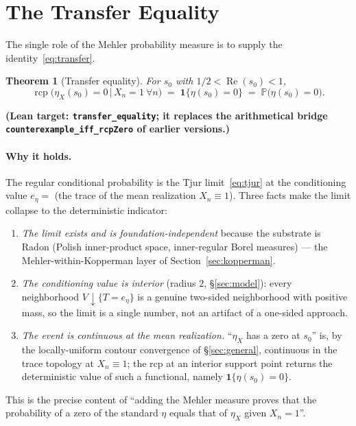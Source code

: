 \documentclass[11pt,a4paper]{article}
\newtheorem{theorem}{Theorem}[section]
\theoremstyle{definition}
\newcommand{\Rea}{\operatorname{Re}}
\newcommand{\etaX}{\eta_X}
\newcommand{\rcp}{\operatorname{rcp}}
\begin{document}
\section{The Transfer Equality}\label{sec:transfer}

The single role of the Mehler probability measure is to supply the identity~\eqref{eq:transfer}.

\begin{theorem}[Transfer equality]\label{thm:transfer}
For \(s_0\) with \(1/2<\Rea(s_0)<1\),
\[
  \rcp\bigl(\etaX(s_0)=0 \,\big|\, X_n=1\ \forall n\bigr)
  \;=\; \mathbf{1}\{\eta(s_0)=0\}
  \;=\; \mathbb{P}\bigl(\eta(s_0)=0\bigr).
\]
\end{theorem}
\textbf{(Lean target: \texttt{transfer\_equality}; it replaces the arithmetical bridge
\texttt{counterexample\_iff\_rcpZero} of earlier versions.)}

\paragraph{Why it holds.} The regular conditional probability is the Tjur
limit~\eqref{eq:tjur} at the conditioning value \(e_\eta=\) (the trace of the mean
realization \(X_n\equiv1\)). Three facts make the limit collapse to the deterministic
indicator:
\begin{enumerate}
  \item \emph{The limit exists and is foundation-independent} because the substrate is
        Radon (Polish inner-product space, inner-regular Borel measures) --- the
        Mehler-within-Kopperman layer of Section~\ref{sec:kopperman}.
  \item \emph{The conditioning value is interior} (radius \(2\), \S\ref{sec:model}): every
        neighborhood \(V\downarrow\{T=e_\eta\}\) is a genuine two-sided neighborhood with
        positive mass, so the limit is a single number, not an artifact of a one-sided
        approach.
  \item \emph{The event is continuous at the mean realization.} ``\(\etaX\) has a zero at
        \(s_0\)'' is, by the locally-uniform contour convergence of \S\ref{sec:general},
        continuous in the trace topology at \(X_n\equiv1\); the rcp at an interior support
        point returns the deterministic value of such a functional, namely
        \(\mathbf{1}\{\eta(s_0)=0\}\).
\end{enumerate}
This is the precise content of ``adding the Mehler measure proves that the probability of
a zero of the standard \(\eta\) equals that of \(\etaX\) given \(X_n=1\)''.
\end{document}
